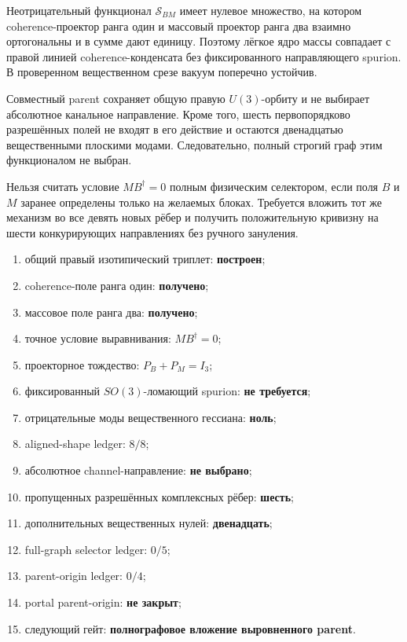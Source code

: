 \begin{theorem}
Неотрицательный функционал $\mathcal S_{BM}$ имеет нулевое множество, на
котором coherence-проектор ранга один и массовый проектор ранга два взаимно
ортогональны и в сумме дают единицу. Поэтому лёгкое ядро массы совпадает с
правой линией coherence-конденсата без фиксированного направляющего spurion.
В проверенном вещественном срезе вакуум поперечно устойчив.
\end{theorem}

\begin{proposition}
Совместный parent сохраняет общую правую $U(3)$-орбиту и не выбирает
абсолютное канальное направление. Кроме того, шесть первопорядково
разрешённых полей не входят в его действие и остаются двенадцатью
вещественными плоскими модами. Следовательно, полный строгий граф этим
функционалом не выбран.
\end{proposition}

\begin{nogocriterion}
Нельзя считать условие $MB^\dagger=0$ полным физическим селектором, если
поля $B$ и $M$ заранее определены только на желаемых блоках. Требуется
вложить тот же механизм во все девять новых рёбер и получить положительную
кривизну на шести конкурирующих направлениях без ручного зануления.
\end{nogocriterion}

\begin{protocol}\begin{enumerate}
\item общий правый изотипический триплет: \textbf{построен};
\item coherence-поле ранга один: \textbf{получено};
\item массовое поле ранга два: \textbf{получено};
\item точное условие выравнивания: \textbf{$MB^\dagger=0$};
\item проекторное тождество: \textbf{$P_B+P_M=I_3$};
\item фиксированный $SO(3)$-ломающий spurion: \textbf{не требуется};
\item отрицательные моды вещественного гессиана: \textbf{ноль};
\item aligned-shape ledger: \textbf{$8/8$};
\item абсолютное channel-направление: \textbf{не выбрано};
\item пропущенных разрешённых комплексных рёбер: \textbf{шесть};
\item дополнительных вещественных нулей: \textbf{двенадцать};
\item full-graph selector ledger: \textbf{$0/5$};
\item parent-origin ledger: \textbf{$0/4$};
\item portal parent-origin: \textbf{не закрыт};
\item следующий гейт: \textbf{полнографовое вложение выровненного parent}.
\end{enumerate}\end{protocol}

